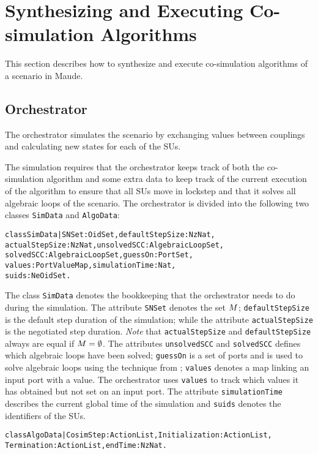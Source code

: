 \section{Synthesizing and Executing Co-simulation Algorithms}\label{sc:synthesize}
This section describes how to synthesize and execute co-simulation algorithms of a scenario in Maude.

\subsection{Orchestrator}
The orchestrator simulates the scenario by exchanging values between couplings and calculating new states for each of the SUs.

The simulation requires that the orchestrator keeps track of both the co-simulation algorithm and some extra data to keep track of the current execution of the algorithm to ensure that all SUs move in lockstep and that it solves all algebraic loops of the scenario.
The orchestrator is divided into the following two classes \texttt{SimData} and \texttt{AlgoData}:
\small
\begin{alltt}
class SimData | SNSet : OidSet,           defaultStepSize : NzNat,
          actualStepSize : NzNat,         unsolvedSCC : AlgebraicLoopSet, 
          solvedSCC : AlgebraicLoopSet,   guessOn : PortSet,
          values : PortValueMap,          simulationTime : Nat,
          suids : NeOidSet .
\end{alltt}
\normalfont
The class \texttt{SimData} denotes the bookkeeping that the orchestrator needs to do during the simulation.
The attribute \texttt{SNSet} denotes the set $M$; \texttt{defaultStepSize} is the default step duration of the simulation; while the attribute \texttt{actualStepSize} is the negotiated step duration.
\emph{Note} that \texttt{actualStepSize} and \texttt{defaultStepSize} always are equal if $M = \emptyset$.
The attributes \texttt{unsolvedSCC} and \texttt{solvedSCC} defines which algebraic loops have been solved; \texttt{guessOn} is a set of ports and is used to solve algebraic loops using the technique from \cite{thrane2021}; \texttt{values} denotes a map linking an input port with a value. 
The orchestrator uses \texttt{values} to track which values it has obtained but not set on an input port. 
The attribute \texttt{simulationTime} describes the current global time of the simulation and \texttt{suids} denotes the identifiers of the SUs.
\small
\begin{alltt}
class AlgoData | CosimStep : ActionList,   Initialization : ActionList, 
                 Termination : ActionList, endTime : NzNat .
\end{alltt}
